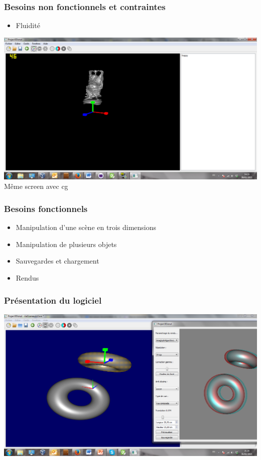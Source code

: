 \documentclass{beamer}
\begin{document}

\begin{frame}
\frametitle{Besoins non fonctionnels et contraintes}
\begin{itemize}[label=$\bullet$]
\item Fluidité
\end{itemize}
\centering
\includegraphics[scale=0.7]{fluidite.png}
\\
Même screen avec cg 
\end{frame}


\begin{frame}
\frametitle{Besoins fonctionnels}
\begin{itemize}[label=$\bullet$]
\item Manipulation d'une scène en trois dimensions
\item Manipulation de plusieurs objets
\item Sauvegardes et chargement
\item Rendus
\end{itemize}
\end{frame}


\begin{frame}
\frametitle{Présentation du logiciel}
\includegraphics[scale=0.22]{logiciel.png}
\end{frame}
\end{document}
